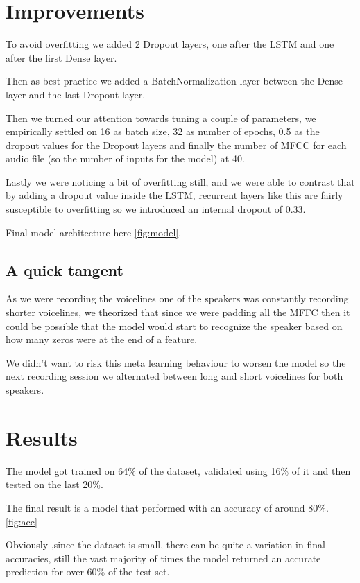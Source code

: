 \documentclass{article}
\begin{document}
\section{Improvements}
	To avoid overfitting we added 2 Dropout layers, one after the LSTM and one after the first Dense layer.

	Then as best practice we added a BatchNormalization layer between the Dense layer and the last Dropout layer.

	Then we turned our attention towards tuning a couple of parameters, we empirically settled on 16 as batch size, 32 as number of epochs, 
	0.5 as the dropout values for the Dropout layers and finally the number of MFCC for each audio file (so the number of inputs for the model) at 40.

	Lastly we were noticing a bit of overfitting still, and we were able to contrast that by adding a dropout value inside the LSTM, recurrent layers like this are
	fairly susceptible to overfitting so we introduced an internal dropout of 0.33.

	Final model architecture here \ref{fig:model}.

	\subsection{A quick tangent}
	As we were recording the voicelines one of the speakers was constantly recording shorter voicelines, we theorized that since we were padding all the 
	MFFC then it could be possible that the model would start to recognize the speaker based on how many zeros were at the end of a feature.

	We didn't want to risk this meta learning behaviour to worsen the model so the next recording session 
	we alternated between long and short voicelines for both speakers. 

\section{Results}
	The model got trained on 64\% of the dataset, validated using 16\% of it and then tested on the last 20\%.

	The final result is a model that performed with an accuracy of around 80\%. \ref{fig:acc}

	Obviously ,since the dataset is small, there can be quite a variation in final accuracies, still 
	the vast majority of times the model returned an accurate prediction for over 60\% of the test set.
\end{document}
